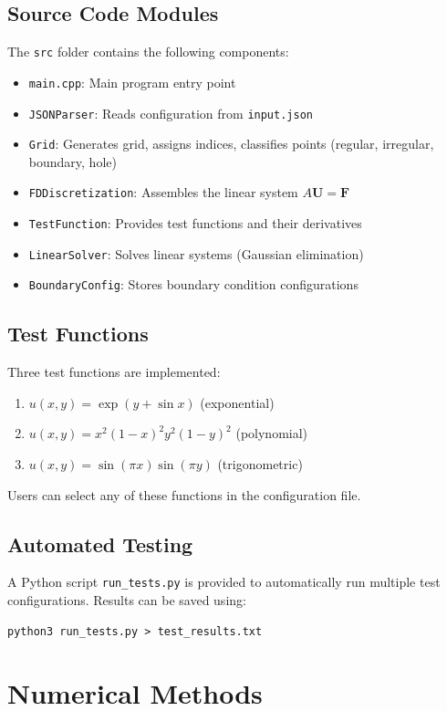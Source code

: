 \documentclass[12pt,a4paper]{article}
\begin{document}
\subsection{Source Code Modules}
The \texttt{src} folder contains the following components:
\begin{itemize}
    \item \texttt{main.cpp}: Main program entry point
    \item \texttt{JSONParser}: Reads configuration from \texttt{input.json}
    \item \texttt{Grid}: Generates grid, assigns indices, classifies points (regular, irregular, boundary, hole)
    \item \texttt{FDDiscretization}: Assembles the linear system \(A\mathbf{U} = \mathbf{F}\)
    \item \texttt{TestFunction}: Provides test functions and their derivatives
    \item \texttt{LinearSolver}: Solves linear systems (Gaussian elimination)
    \item \texttt{BoundaryConfig}: Stores boundary condition configurations
\end{itemize}

\subsection{Test Functions}
Three test functions are implemented:
\begin{enumerate}
    \item \(u(x,y) = \exp(y + \sin x)\) (exponential)
    \item \(u(x,y) = x^2(1-x)^2 y^2(1-y)^2\) (polynomial)
    \item \(u(x,y) = \sin(\pi x)\sin(\pi y)\) (trigonometric)
\end{enumerate}
Users can select any of these functions in the configuration file.

\subsection{Automated Testing}
A Python script \texttt{run\_tests.py} is provided to automatically run multiple test configurations. Results can be saved using:
\begin{verbatim}
python3 run_tests.py > test_results.txt
\end{verbatim}

\section{Numerical Methods}
\end{document}
